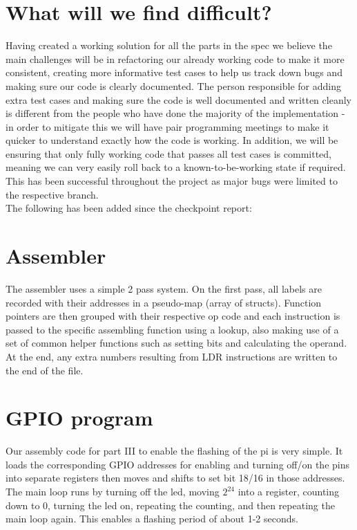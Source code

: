 \documentclass{article}
\begin{document}
\section{What will we find difficult?}
Having created a working solution for all the parts in the spec we believe the main challenges will be in refactoring our already working code to make it more consistent, creating more informative test cases to help us track down bugs and making sure our code is clearly documented. The person responsible for adding extra test cases and making sure the code is well documented and written cleanly is different from the people who have done the majority of the implementation - in order to mitigate this we will have pair programming meetings to make it quicker to understand exactly how the code is working. In addition, we will be ensuring that only fully working code that passes all test cases is committed, meaning we can very easily roll back to a known-to-be-working state if required. This has been successful throughout the project as major bugs were limited to the respective branch.\\

The following has been added since the checkpoint report:
\section{Assembler}
The assembler uses a simple 2 pass system. On the first pass, all labels are recorded with their addresses in a pseudo-map (array of structs). Function pointers are then grouped with their respective op code and each instruction is passed to the specific assembling function using a lookup, also making use of a set of common helper functions such as setting bits and calculating the operand. At the end, any extra numbers resulting from LDR instructions are written to the end of the file.

\section{GPIO program}
Our assembly code for part III to enable the flashing of the pi is very simple. It loads the corresponding GPIO addresses for enabling and turning off/on the pins into separate registers then moves and shifts to set bit 18/16 in those addresses.\\
The main loop runs by turning off the led, moving $2^{24}$ into a register, counting down to 0, turning the led on, repeating the counting, and then repeating the main loop again. This enables a flashing period of about 1-2 seconds.\\
\end{document}
